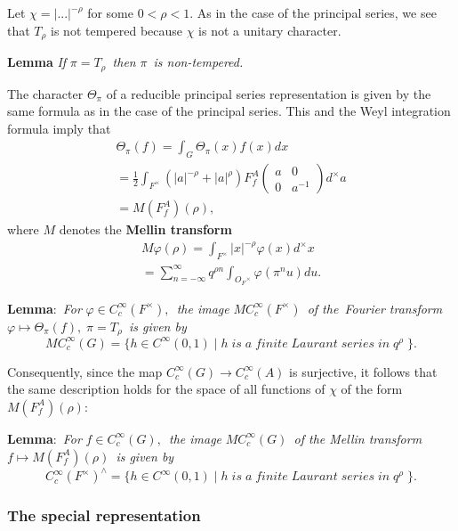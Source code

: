 Let $\chi =|...|^{-\rho }$ for some $0<\rho <1.$ As in the case of the
principal series, we see that $T_\rho $ is not tempered because $\chi $ is
not a unitary character.

{\bf Lemma} {\em If }$\pi =T_\rho ${\em \ then }$\pi ${\em \ is non-tempered.%
}

The character $\Theta _\pi $ of a reducible principal series representation
is given by the same formula as in the case of the principal series. This
and the Weyl integration formula imply that 
\[
\begin{array}{c}
\Theta _\pi (f)=\int_G\Theta _\pi (x)f(x)dx \\ 
=\frac 12\int_{F^{\times }}(|a|^{-\rho }+|a|^\rho )F_f^A( 
\begin{array}{cc}
a & 0 \\ 
0 & a^{-1}
\end{array}
)d^{\times }a \\ 
=M(F_f^A)(\rho ),
\end{array}
\]
where $M$ denotes the {\bf Mellin transform} 
\[
\begin{array}{c}
M\varphi (\rho )=\int_{F^{\times }}|x|^{-\rho }\varphi (x)d^{\times }x \\ 
=\sum_{n=-\infty }^\infty q^{\rho n}\int_{O_F{}^{\times }}\varphi (\pi
^nu)du.
\end{array}
\]

{\bf Lemma}:{\em \ For }$\varphi \in C_c^\infty (F^{\times }),${\em \ the
image }$MC_c^\infty (F^{\times })${\em \ of the\ Fourier transform }$\varphi
\longmapsto \Theta _\pi (f),\;\pi =T_\rho ${\em \ is given by} 
\[
MC_c^\infty (G)=\{h\in C^\infty
(0,1)\;|\;h\;is\;a\;finite\;Laurant\;series\;in\;q^\rho \;\}. 
\]

Consequently, since the map $C_c^\infty (G)\rightarrow C_c^\infty (A)$ is
surjective, it follows that the same description holds for the space of all
functions of $\chi $ of the form $M(F_f^A)(\rho ):$

{\bf Lemma}:{\em \ For }$f\in C_c^\infty (G),${\em \ the image }$MC_c^\infty
(G)${\em \ of the Mellin transform }$f\longmapsto M(F_f^A)(\rho )${\em \ is
given by} 
\[
C_c^\infty (F^{\times })^{\wedge }=\{h\in C^\infty
(0,1)\;|\;h\;is\;a\;finite\;Laurant\;series\;in\;q^\rho \;\}. 
\]

\subsubsection{The special representation}

